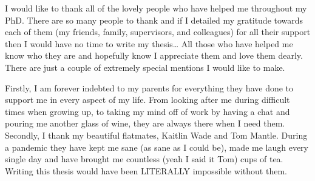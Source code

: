 \documentclass[11pt,twoside]{bristolthesis}
\begin{document}
  \begin{acknowledgements}
    I would like to thank all of the lovely people who have helped me throughout my PhD. There are so many people to thank and if I detailed my gratitude towards each of them (my friends, family, supervisors, and colleagues) for all their support then I would have no time to write my thesis\ldots{} All those who have helped me know who they are and hopefully know I appreciate them and love them dearly. There are just a couple of extremely special mentions I would like to make.

    Firstly, I am forever indebted to my parents for everything they have done to support me in every aspect of my life. From looking after me during difficult times when growing up, to taking my mind off of work by having a chat and pouring me another glass of wine, they are always there when I need them. Secondly, I thank my beautiful flatmates, Kaitlin Wade and Tom Mantle. During a pandemic they have kept me sane (as sane as I could be), made me laugh every single day and have brought me countless (yeah I said it Tom) cups of tea. Writing this thesis would have been LITERALLY impossible without them.
  \end{acknowledgements}
\end{document}
